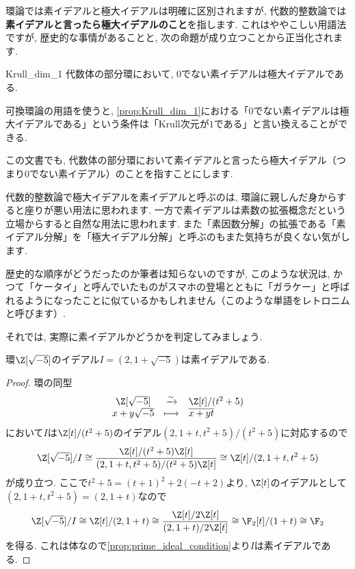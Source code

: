 \documentclass[11pt,b5paper,oneside,titlepage,lualatex]{ltjsreport}
\numberwithin{equation}{section} %
\begin{document}
環論では素イデアルと極大イデアルは明確に区別されますが, 代数的整数論では\textbf{素イデアルと言ったら極大イデアルのこと}を指します. 
これはややこしい用語法ですが, 歴史的な事情があることと, 次の命題が成り立つことから正当化されます. 

\begin{prop}{}{Krull_dim_1}
	代数体の部分環において, $ 0 $でない素イデアルは極大イデアルである. 
\end{prop}

\begin{rem}{}{}
	可換環論の用語を使うと, \cref{prop:Krull_dim_1}における「$ 0 $でない素イデアルは極大イデアルである」という条件は「Krull次元が$ 1 $である」と言い換えることができる. 
\end{rem}

この文書でも, 代数体の部分環において素イデアルと言ったら極大イデアル（つまり$ 0 $でない素イデアル）のことを指すことにします. 

\begin{ringnote}
	代数的整数論で極大イデアルを素イデアルと呼ぶのは, 環論に親しんだ身からすると座りが悪い用法に思われます. 
	一方で素イデアルは素数の拡張概念だという立場からすると自然な用法に思われます. 
	また「素因数分解」の拡張である「素イデアル分解」を「極大イデアル分解」と呼ぶのもまた気持ちが良くない気がします. 
	
	歴史的な順序がどうだったのか筆者は知らないのですが, このような状況は, かつて「ケータイ」と呼んでいたものがスマホの登場とともに「ガラケー」と呼ばれるようになったことに似ているかもしれません（このような単語をレトロニムと呼びます）. 
\end{ringnote}

それでは, 実際に素イデアルかどうかを判定してみましょう. 

\begin{prop}{}{}
	環$ \Z[\sqrt{-5}] $のイデアル$ I = (2, 1 + \sqrt{-5}) $は素イデアルである. 
\end{prop}

\begin{proof}
	環の同型
	\[
	\begin{array}{ccl}
		\Z[\sqrt{-5}] & \xrightarrow{\sim} & \Z[t]/(t^2 + 5) \\
		x + y\sqrt{-5} & \longmapsto & \overline{x + yt}
	\end{array}
	\]
	において$ I $は$ \Z[t]/(t^2 + 5) $のイデアル$ (2, 1+t, t^2+5)/(t^2 + 5) $に対応するので
	\[
	\Z[\sqrt{-5}]/I \cong \frac{\Z[t]/(t^2 + 5) \Z[t]}{(2, 1+t, t^2+5)/(t^2 + 5) \Z[t]}
	\cong \Z[t]/(2, 1+t, t^2+5)
	\]
	が成り立つ. 
	ここで$ t^2 + 5 = (t+1)^2 + 2(-t + 2) $より, $ \Z[t] $のイデアルとして$ (2, 1+t, t^2+5) = (2, 1+t) $なので
	\[
	\Z[\sqrt{-5}]/I \cong \Z[t]/(2, 1+t)
	\cong \frac{\Z[t]/2\Z[t]}{(2, 1+t)/2\Z[t]}
	\cong \F_2[t]/(1+t)
	\cong \F_2
	\]
	を得る. 
	これは体なので\cref{prop:prime_ideal_condition}より$ I $は素イデアルである. 
\end{proof}
\end{document}
